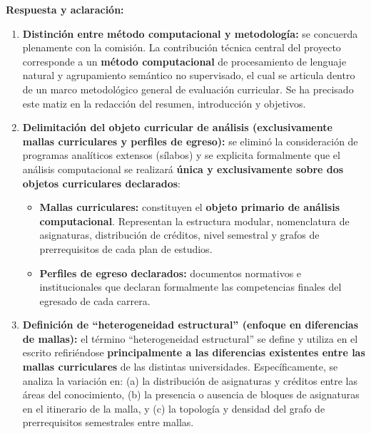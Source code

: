 \vspace{0.2cm}

\noindent
\textbf{Respuesta y aclaración:}
\begin{enumerate}[leftmargin=*]
	\item \textbf{Distinción entre método computacional y metodología:} se concuerda plenamente con la comisión. La contribución técnica central del proyecto corresponde a un \textbf{método computacional} de procesamiento de lenguaje natural y agrupamiento semántico no supervisado, el cual se articula dentro de un marco metodológico general de evaluación curricular. Se ha precisado este matiz en la redacción del resumen, introducción y objetivos.
	\item \textbf{Delimitación del objeto curricular de análisis (exclusivamente mallas curriculares y perfiles de egreso):} se eliminó la consideración de programas analíticos extensos (sílabos) y se explicita formalmente que el análisis computacional se realizará \textbf{única y exclusivamente sobre dos objetos curriculares declarados}:
	      \begin{itemize}
		      \item \textbf{Mallas curriculares:} constituyen el \textbf{objeto primario de análisis computacional}. Representan la estructura modular, nomenclatura de asignaturas, distribución de créditos, nivel semestral y grafos de prerrequisitos de cada plan de estudios.
		      \item \textbf{Perfiles de egreso declarados:} documentos normativos e institucionales que declaran formalmente las competencias finales del egresado de cada carrera.
	      \end{itemize}
	\item \textbf{Definición de ``heterogeneidad estructural'' (enfoque en diferencias de mallas):} el término ``heterogeneidad estructural'' se define y utiliza en el escrito refiriéndose \textbf{principalmente a las diferencias existentes entre las mallas curriculares} de las distintas universidades. Específicamente, se analiza la variación en: (a) la distribución de asignaturas y créditos entre las áreas del conocimiento, (b) la presencia o ausencia de bloques de asignaturas en el itinerario de la malla, y (c) la topología y densidad del grafo de prerrequisitos semestrales entre mallas.
\end{enumerate}

\vspace{0.4cm}

